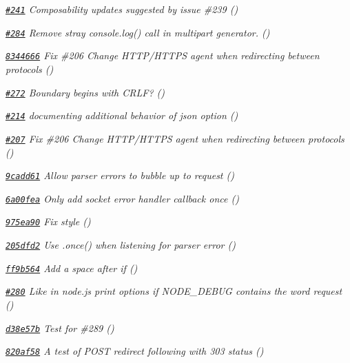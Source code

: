 \begin{DoxyItemize}
\item {\itshape \href{https://github.com/mikeal/request/pull/241}{\tt \#241} Composability updates suggested by issue \#239 ()}
\item {\itshape \href{https://github.com/mikeal/request/pull/284}{\tt \#284} Remove stray {\ttfamily console.\+log()} call in multipart generator. ()}
\item {\itshape \href{https://github.com/mikeal/request/commit/8344666f682a302c914cce7ae9cea8de054f9240}{\tt 8344666} Fix \#206 Change H\+T\+T\+P/\+H\+T\+T\+P\+S agent when redirecting between protocols ()}
\item {\itshape \href{https://github.com/mikeal/request/pull/272}{\tt \#272} Boundary begins with C\+R\+L\+F? ()}
\item {\itshape \href{https://github.com/mikeal/request/pull/214}{\tt \#214} documenting additional behavior of json option ()}
\item {\itshape \href{https://github.com/mikeal/request/pull/207}{\tt \#207} Fix \#206 Change H\+T\+T\+P/\+H\+T\+T\+P\+S agent when redirecting between protocols ()}
\item {\itshape \href{https://github.com/mikeal/request/commit/9cadd61d989e85715ea07da8770a3077db41cca3}{\tt 9cadd61} Allow parser errors to bubble up to request ()}
\item {\itshape \href{https://github.com/mikeal/request/commit/6a00fea09eed99257c0aec2bb66fbf109b0f573a}{\tt 6a00fea} Only add socket error handler callback once ()}
\item {\itshape \href{https://github.com/mikeal/request/commit/975ea90bed9503c67055b20e36baf4bcba54a052}{\tt 975ea90} Fix style ()}
\item {\itshape \href{https://github.com/mikeal/request/commit/205dfd2e21c13407d89d3ed92dc2b44b987d962b}{\tt 205dfd2} Use .once() when listening for parser error ()}
\item {\itshape \href{https://github.com/mikeal/request/commit/ff9b5643d6b5679a9e7d7997ec6275dac10b000e}{\tt ff9b564} Add a space after if ()}
\item {\itshape \href{https://github.com/mikeal/request/pull/280}{\tt \#280} Like in node.\+js print options if N\+O\+D\+E\+\_\+\+D\+E\+B\+U\+G contains the word request ()}
\item {\itshape \href{https://github.com/mikeal/request/commit/d38e57bbb3d827aa87427f2130aa5a5a3a973161}{\tt d38e57b} Test for \#289 ()}
\item {\itshape \href{https://github.com/mikeal/request/commit/820af5839f2a193d091d98f23fd588bd919e3e58}{\tt 820af58} A test of P\+O\+S\+T redirect following with 303 status ()}

\end{DoxyItemize}
